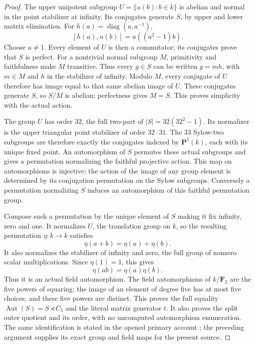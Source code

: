 \begin{proof}
The upper unipotent subgroup
\(U=\{u(b):b\in k\}\) is abelian and normal in
the point stabilizer at infinity.
Its conjugates generate \(S\), by upper and lower
matrix elimination.
For \(h(a)=\operatorname{diag}(a,a^{-1})\),
\[
                 [h(a),u(b)]=u((a^2-1)b).
 \tag{D.45.37}
\]
Choose \(a\ne1\). Every element of \(U\) is then
a commutator; its conjugates prove that \(S\)
is perfect.
For a nontrivial normal subgroup \(M\), primitivity
and faithfulness make \(M\) transitive.
Thus every \(g\in S\) can be written \(g=mh\),
with \(m\in M\) and \(h\) in the stabilizer of
infinity.
Modulo \(M\), every conjugate of \(U\) therefore
has image equal to that same abelian image of
\(U\). These conjugates generate \(S\), so
\(S/M\) is abelian; perfectness gives \(M=S\).
This proves simplicity with the actual action.

The group \(U\) has order \(32\), the full
two-part of \(|S|=32(32^2-1)\).
Its normalizer is the upper triangular point
stabilizer of order \(32\cdot31\).
The \(33\) Sylow-two subgroups are therefore
exactly the conjugates indexed by
\(\mathbf P^1(k)\), each with its unique fixed
point.
An automorphism of \(S\) permutes these actual
subgroups and gives a permutation normalizing
the faithful projective action.
This map on automorphisms is injective:
the action of the image of any group element
is determined by its conjugation permutation
on the Sylow subgroups.
Conversely a permutation normalizing \(S\)
induces an automorphism of this faithful
permutation group.

Compose such a permutation by the unique
element of \(S\) making it fix infinity, zero
and one. It normalizes \(U\), the translation
group on \(k\), so the resulting permutation
\(\eta:k\to k\) satisfies
\[
                \eta(a+b)=\eta(a)+\eta(b).
 \tag{D.45.38}
\]
It also normalizes the stabilizer of infinity
and zero, the full group of nonzero scalar
multiplications. Since \(\eta(1)=1\), this
gives
\[
                \eta(ab)=\eta(a)\eta(b).
 \tag{D.45.39}
\]
Thus it is an actual field automorphism.
The field automorphisms of \(k/\mathbf F_2\)
are the five powers of squaring: the image of
an element of degree five has at most five
choices, and these five powers are distinct.
This proves the full equality
\(\operatorname{Aut}(S)=S\rtimes C_5\) and the
literal matrix generator \(t\).
It also proves the split outer quotient and
its order, with no uncomputed automorphism
enumeration.
The same identification is stated in the
opened primary account
\cite[\S3, preceding Lemma~3.1; Lemma~3.2]{ACyclicOuterWhite2011};
the preceding argument supplies its exact
group and field maps for the present source.


\end{proof}
